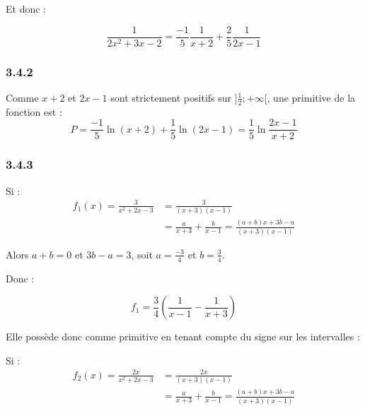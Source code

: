 \documentclass[a4paper,10pt]{report}
\begin{document}
Et donc :

\begin{displaymath}
	\frac{1}{2x^2 + 3x -2} = \frac{-1}{5}\frac{1}{x+2} +  \frac{2}{5}\frac{1}{2x-1}
\end{displaymath}

\subsubsection*{3.4.2}

Comme $x+2$ et $2x-1$ sont strictement positifs sur $]\frac{1}{2};+\infty[$, une primitive de la fonction est :
\begin{displaymath}
	P = \frac{-1}{5}\ln(x+2)+  \frac{1}{5}\ln(2x-1) = \frac{1}{5}\ln \frac{2x-1}{x+2}
\end{displaymath}

\subsubsection*{3.4.3}

Si :
\begin{equation*}
	\begin{split}
		f_1(x) =\frac{3}{x^2 + 2x -3} &= \frac{3}{(x+3)(x-1)} \\
		&= \frac{a}{x+3} +  \frac{b}{x-1} = \frac{(a+b)x + 3b -a}{(x+3)(x-1)}
	\end{split}
\end{equation*}

Alors $a+b=0$ et $3b-a = 3$, soit $a=\frac{-3}{4}$ et $b = \frac{3}{4}$.

Donc :

\begin{displaymath}
	f_1 = \frac{3}{4} \left( \frac{1}{x-1} - \frac{1}{x+3} \right)
\end{displaymath}

Elle possède donc comme primitive en tenant compte du signe sur les intervalles :


Si :
\begin{equation*}
	\begin{split}
		f_2(x) =\frac{2x}{x^2 + 2x -3} &= \frac{2x}{(x+3)(x-1)} \\
		                               &= \frac{a}{x+3} +  \frac{b}{x-1} = \frac{(a+b)x + 3b -a}{(x+3)(x-1)}
	\end{split}
\end{equation*}
\end{document}
